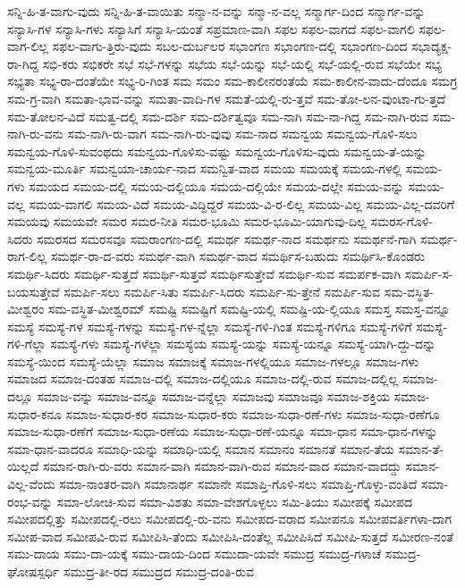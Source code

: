 {ಸನ್ನಿ-ಹಿ-ತ-ವಾಗು-ವುದು
ಸನ್ನಿ-ಹಿ-ತ-ವಾಯಿತು
ಸನ್ಮಾ-ನ-ವನ್ನು
ಸನ್ಮಾ-ನ-ವಲ್ಲ
ಸನ್ಮಾರ್ಗ-ದಿಂದ
ಸನ್ಮಾರ್ಗ-ವನ್ನು
ಸನ್ಯಾಸಿ-ಗಳ
ಸನ್ಯಾಸಿ-ಗಳು
ಸನ್ಯಾಸಿಗೆ
ಸನ್ಯಾಸಿ-ಯಂತೆ
ಸಪ್ರಮಾಣ-ವಾಗಿ
ಸಫಲ
ಸಫಲ-ವಾಗದೆ
ಸಫಲ-ವಾಗಲಿ
ಸಫಲ-ವಾಗ-ಲಿಲ್ಲ
ಸಫಲ-ವಾಗು-ತ್ತಿರು-ವುದು
ಸಬಲ-ದುರ್ಬಲರ
ಸಭಾಂಗಣ
ಸಭಾಂಗಣ-ದಲ್ಲಿ
ಸಭಾಂಗಣ-ದಿಂದ
ಸಭಾದ್ಯಕ್ಷ-ರಾ-ಗಿದ್ದ
ಸಭಿ-ಕರು
ಸಭಿಕರೇ
ಸಭೆ
ಸಭೆ-ಗಳನ್ನು
ಸಭೆಯ
ಸಭೆ-ಯನ್ನು
ಸಭೆ-ಯಲ್ಲಿ
ಸಭೆ-ಯಲ್ಲಿ-ರುವ
ಸಭೆಯೇ
ಸಭ್ಯ
ಸಭ್ಯತಾ
ಸಭ್ಯ-ರಾ-ದಂತೆಯೇ
ಸಭ್ಯ-ರಿ-ಗಿಂತ
ಸಮ
ಸಮಂ
ಸಮ-ಕಾಲೀನರಂತೆಯೆ
ಸಮ-ಕಾಲೀನ-ವಾದು-ದೆಂದೂ
ಸಮಗ್ರ
ಸಮ-ಗ್ರ-ವಾಗಿ
ಸಮತಾ-ಭಾವ-ವನ್ನು
ಸಮತಾ-ವಾದಿ-ಗಳ
ಸಮತೆ-ಯಲ್ಲಿ-ರು-ತ್ತವೆ
ಸಮ-ತೋ-ಲನ-ವುಂಟಾ-ಗು-ತ್ತದೆ
ಸಮ-ತೋಲನ-ವಿದೆ
ಸಮತ್ವ-ದಲ್ಲಿ
ಸಮ-ದರ್ಶಿ
ಸಮ-ದರ್ಶಿತ್ವವೂ
ಸಮ-ನಾಗಿ
ಸಮ-ನಾ-ಗಿದ್ದ
ಸಮ-ನಾಗಿ-ರುವ
ಸಮ-ನಾಗಿ-ರು-ವನು
ಸಮ-ನಾಗಿ-ರು-ವಾಗ
ಸಮ-ನಾಗಿ-ರು-ವುವು
ಸಮ-ನಾದ
ಸಮನ್ವಯ
ಸಮನ್ವಯ-ಗೊಳಿ-ಸಲು
ಸಮನ್ವಯ-ಗೊಳಿ-ಸುವಂಥದು
ಸಮನ್ವಯ-ಗೊಳಿಸು-ವಷ್ಟು
ಸಮನ್ವಯ-ಗೊಳಿಸು-ವುದು
ಸಮನ್ವಯ-ತೆ-ಯನ್ನು
ಸಮನ್ವಯ-ಮೂರ್ತಿ
ಸಮನ್ವಯಾ-ಚಾರ್ಯ-ನಾದ
ಸಮನ್ವಿತ-ವಾದ
ಸಮಯ
ಸಮಯಕ್ಕೆ
ಸಮಯ-ಗಳಲ್ಲಿ
ಸಮಯ-ಗಳು
ಸಮಯದ
ಸಮಯ-ದಲ್ಲಿ
ಸಮಯ-ದಲ್ಲಿಯೂ
ಸಮಯ-ದಲ್ಲಿಯೇ
ಸಮಯ-ದಲ್ಲೇ
ಸಮಯ-ವನ್ನು
ಸಮಯ-ವಲ್ಲ
ಸಮಯ-ವಾಗಲಿ
ಸಮಯ-ವಿದೆ
ಸಮಯ-ವಿದ್ದಿದ್ದರೆ
ಸಮಯ-ವಿ-ರ-ಲಿಲ್ಲ
ಸಮಯ-ವಿಲ್ಲ
ಸಮಯ-ವಿಲ್ಲ-ದವರಿಗೆ
ಸಮಯವು
ಸಮಯವೇ
ಸಮರ
ಸಮರ-ನೀತಿ
ಸಮರ-ಭೂಮಿ
ಸಮರ-ಭೂಮಿ-ಯಾಗುವು-ದಿಲ್ಲ
ಸಮರಸ-ಗೊಳಿ-ಸಿದರು
ಸಮರಸದ
ಸಮರಸವೂ
ಸಮರಾಂಗಣ-ದಲ್ಲಿ
ಸಮರ್ಥ
ಸಮರ್ಥ-ನಾದ
ಸಮರ್ಥನು
ಸಮರ್ಥನೆ-ಗಾಗಿ
ಸಮರ್ಥ-ರಾಗ-ಲಿಲ್ಲ
ಸಮರ್ಥ-ರಾ-ದ-ವರು
ಸಮರ್ಥ-ವಾಗಿ
ಸಮರ್ಥ-ವಾದ
ಸಮರ್ಥಿಸ-ಬಹುದು
ಸಮರ್ಥಿಸಿ-ಕೊಂಡರು
ಸಮರ್ಥಿ-ಸಿದರು
ಸಮರ್ಥಿ-ಸುತ್ತದೆ
ಸಮರ್ಥಿ-ಸುತ್ತವೆ
ಸಮರ್ಥಿಸುತ್ತೇವೆ
ಸಮರ್ಥಿ-ಸುವ
ಸಮರ್ಪಕ-ವಾಗಿ
ಸಮರ್ಪಿ-ಸ-ಬಯಸುತ್ತೇವೆ
ಸಮರ್ಪಿ-ಸಲು
ಸಮರ್ಪಿ-ಸಿತು
ಸಮರ್ಪಿ-ಸಿದರು
ಸಮರ್ಪಿ-ಸು-ತ್ತೇನೆ
ಸಮರ್ಪಿ-ಸುವ
ಸಮ-ವಸ್ಥಿತ-ಮೀಶ್ವರಂ
ಸಮ-ವಸ್ಥಿತ-ಮೀಶ್ವರಮ್
ಸಮಷ್ಟಿ
ಸಮಷ್ಟಿಗೆ
ಸಮಷ್ಟಿ-ಯಲ್ಲಿ
ಸಮಷ್ಟಿ-ಯ-ಲ್ಲಿಯೂ
ಸಮಸ್ತ
ಸಮಸ್ತ-ವನ್ನೂ
ಸಮಸ್ಯೆ
ಸಮಸ್ಯೆ-ಗಳ
ಸಮಸ್ಯೆ-ಗಳನ್ನು
ಸಮಸ್ಯೆ-ಗಳ-ನ್ನೆಲ್ಲಾ
ಸಮಸ್ಯೆ-ಗಳಿ-ಗಿಂತ
ಸಮಸ್ಯೆ-ಗಳಿಗೂ
ಸಮಸ್ಯೆ-ಗಳಿಗೆ
ಸಮಸ್ಯೆ-ಗಳಿ-ಗೆಲ್ಲಾ
ಸಮಸ್ಯೆ-ಗಳು
ಸಮಸ್ಯೆ-ಗಳೆಲ್ಲಾ
ಸಮಸ್ಯೆಯ
ಸಮಸ್ಯೆ-ಯನ್ನು
ಸಮಸ್ಯೆ-ಯನ್ನೂ
ಸಮಸ್ಯೆ-ಯಾಗಿ-ದ್ದು-ದನ್ನು
ಸಮಸ್ಯೆ-ಯಿಂದ
ಸಮಸ್ಯೆ-ಯೆಲ್ಲಾ
ಸಮಾಜ
ಸಮಾಜಕ್ಕೆ
ಸಮಾಜ-ಗಳಲ್ಲಿಯೂ
ಸಮಾಜ-ಗಳಲ್ಲೂ
ಸಮಾಜ-ಗಳು
ಸಮಾಜದ
ಸಮಾಜ-ದಂತಹ
ಸಮಾಜ-ದಲ್ಲಿ
ಸಮಾಜ-ದಲ್ಲಿಯೂ
ಸಮಾಜ-ದಲ್ಲಿ-ರುವ
ಸಮಾಜ-ದಲ್ಲಿಲ್ಲ
ಸಮಾಜ-ದಲ್ಲೂ
ಸಮಾಜ-ವನ್ನು
ಸಮಾಜ-ವನ್ನೂ
ಸಮಾಜ-ವನ್ನೆಲ್ಲಾ
ಸಮಾಜವು
ಸಮಾಜವೂ
ಸಮಾಜ-ಶಕ್ತಿಯ
ಸಮಾಜ-ಸುಧಾರ-ಕನೂ
ಸಮಾಜ-ಸುಧಾರ-ಕರ
ಸಮಾಜ-ಸುಧಾರ-ಕರು
ಸಮಾಜ-ಸುಧಾ-ರಣೆ-ಗಳು
ಸಮಾಜ-ಸುಧಾ-ರಣೆಗೂ
ಸಮಾಜ-ಸುಧಾ-ರಣೆಗೆ
ಸಮಾಜ-ಸುಧಾ-ರಣೆಯ
ಸಮಾಜ-ಸುಧಾ-ರಣೆ-ಯನ್ನೂ
ಸಮಾ-ಧಾನ
ಸಮಾ-ಧಾನ-ಗಳನ್ನು
ಸಮಾ-ಧಾನ-ವಾದರೂ
ಸಮಾಧಿ-ಯನ್ನು
ಸಮಾಧಿ-ಯಲ್ಲಿ
ಸಮಾನ
ಸಮಾನಂ
ಸಮಾನತೆ
ಸಮಾನ-ತೆಯ
ಸಮಾನ-ತೆ-ಯಿಲ್ಲದೆ
ಸಮಾನ-ರಾಗಿ-ರು-ವರು
ಸಮಾನ-ವಾಗಿ
ಸಮಾನ-ವಾಗಿ-ರುವ
ಸಮಾನ-ವಾದ
ಸಮಾನ-ವಾದದ್ದು
ಸಮಾನ-ವಿಲ್ಲ-ವೆಂದು
ಸಮಾ-ನಾಂತರ-ವಾಗಿ
ಸಮಾನಾರ್ಥ
ಸಮಾನೇ
ಸಮಾಪ್ತಿ-ಗೊಳಿ-ಸಲು
ಸಮಾಪ್ತಿ-ಗೊಳ್ಳು-ವಂತಿದೆ
ಸಮಾ-ರಂಭ-ವನ್ನು
ಸಮಾ-ಲೋಚಿ-ಸುವ
ಸಮಾ-ವಿಶತು
ಸಮಾ-ವೇಶಗೊಳ್ಳಲು
ಸಮಿ-ತಿಯು
ಸಮೀಪಕ್ಕೆ
ಸಮೀಪದ
ಸಮೀಪದಲ್ಲಿತ್ತು
ಸಮೀಪದಲ್ಲಿ-ರಲು
ಸಮೀಪದಲ್ಲಿ-ರು-ವನು
ಸಮೀಪದ-ವರಾದ
ಸಮೀಪನೂ
ಸಮೀಪವರ್ತಿಗಳಾ-ದಾಗ
ಸಮೀಪ-ವಾದ
ಸಮೀಪವಿ-ರುವ
ಸಮೀಪಿಸಿ-ತೆಂದು
ಸಮೀಪಿಸಿ-ದಂತೆಲ್ಲ
ಸಮೀಪಿಸಿದೆ
ಸಮೀಪಿ-ಸುತ್ತದೆ
ಸಮೀರಣ-ನಂತೆ
ಸಮು-ದಾಯ
ಸಮು-ದಾ-ಯಕ್ಕೆ
ಸಮು-ದಾಯ-ದಿಂದ
ಸಮುದಾ-ಯವೇ
ಸಮುದ್ರ
ಸಮುದ್ರ-ಗಳಾಚೆ
ಸಮುದ್ರ-ಘೋಷಸ್ಪರ್ಧಿ
ಸಮುದ್ರ-ತೀ-ರದ
ಸಮುದ್ರದ
ಸಮುದ್ರ-ದಂತಿ-ರುವ
}
